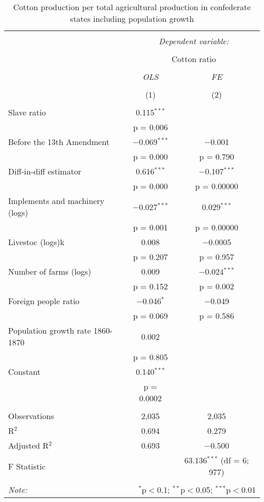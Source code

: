 \documentclass[12pt]{report}
\begin{document}
\begin{table}[!htbp] \centering 
  \caption{Cotton production per total agricultural production in confederate states including population growth} 
  \label{tab:cotcsa} 
\begin{tabular}{@{\extracolsep{5pt}}lcc} 
\\[-1.8ex]\hline 
\hline \\[-1.8ex] 
 & \multicolumn{2}{c}{\textit{Dependent variable:}} \\ 
\cline{2-3} 
\\[-1.8ex] & \multicolumn{2}{c}{Cotton ratio} \\ 
\\[-1.8ex] & \textit{OLS} & \textit{FE} \\ 
\\[-1.8ex] & (1) & (2)\\ 
\hline \\[-1.8ex] 
 Slave ratio & 0.115$^{***}$ &  \\ 
  & p = 0.006 &  \\ 
  Before the 13th Amendment & $-$0.069$^{***}$ & $-$0.001 \\ 
  & p = 0.000 & p = 0.790 \\ 
  Diff-in-diff estimator & 0.616$^{***}$ & $-$0.107$^{***}$ \\ 
  & p = 0.000 & p = 0.00000 \\ 
  Implements and machinery (logs) & $-$0.027$^{***}$ & 0.029$^{***}$ \\ 
  & p = 0.001 & p = 0.00000 \\ 
  Livestoc (logs)k & 0.008 & $-$0.0005 \\ 
  & p = 0.207 & p = 0.957 \\ 
  Number of farms (logs) & 0.009 & $-$0.024$^{***}$ \\ 
  & p = 0.152 & p = 0.002 \\ 
  Foreign people ratio & $-$0.046$^{*}$ & $-$0.049 \\ 
  & p = 0.069 & p = 0.586 \\ 
  Population growth rate 1860-1870 & 0.002 &  \\ 
  & p = 0.805 &  \\ 
  Constant & 0.140$^{***}$ &  \\ 
  & p = 0.0002 &  \\ 
 \hline \\[-1.8ex] 
Observations & 2,035 & 2,035 \\ 
R$^{2}$ & 0.694 & 0.279 \\ 
Adjusted R$^{2}$ & 0.693 & $-$0.500 \\ 
F Statistic &  & 63.136$^{***}$ (df = 6; 977) \\ 
\hline 
\hline \\[-1.8ex] 
\textit{Note:}  & \multicolumn{2}{r}{$^{*}$p$<$0.1; $^{**}$p$<$0.05; $^{***}$p$<$0.01} \\ 
\end{tabular} 
\end{table} 
\end{document}
